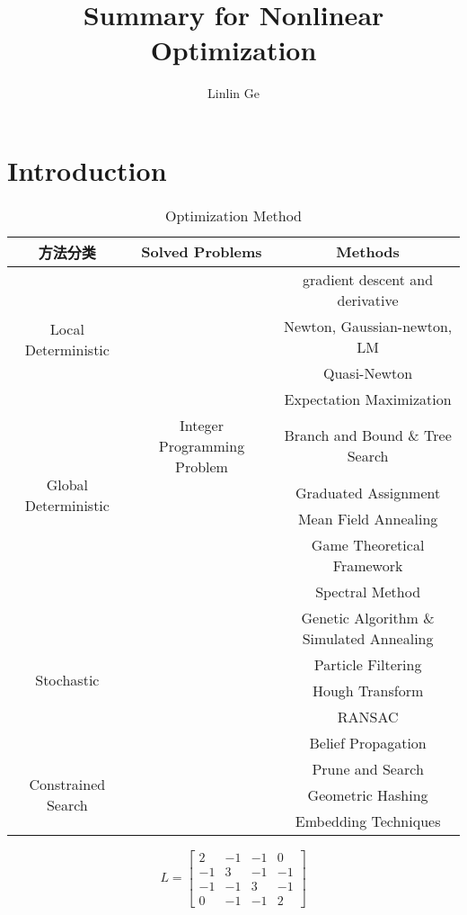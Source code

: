 \documentclass[10pt]{article}
\title{Summary for Nonlinear Optimization}
\author{Linlin Ge}
\date{}
\begin{document}
\maketitle

\section{Introduction}





\begin{table}[H]
\centering
\caption{Optimization Method}
\label{table1}
\begin{tabular}{|c|c|c|}
\hline  %
\multicolumn{1}{|c|}{方法分类}& Solved Problems  & Methods\\
\hline  %
\multirow{4}{*}{Local Deterministic}
 &  &gradient descent and derivative   \\
\cline{2-3}  %
~& & Newton, Gaussian-newton, LM \\
\cline{2-3}  %
~& & Quasi-Newton \\
\cline{2-3}  %
~& & Expectation Maximization \\


\hline  %
\multirow{4}{*}{Global Deterministic}
 &Integer Programming Problem  &Branch and Bound \& Tree Search   \\
\cline{2-3}  %
~& & Graduated Assignment \\
\cline{2-3}  %
~& & Mean Field Annealing \\
\cline{2-3}  %
~& & Game Theoretical Framework \\
\cline{2-3}  %
~& & Spectral Method \\

\hline  %
\multirow{5}{*}{Stochastic}
 & & Genetic Algorithm \& Simulated Annealing   \\
\cline{2-3}  %
~& & Particle Filtering \\
\cline{2-3}  %
~& & Hough Transform \\
\cline{2-3}  %
~& &RANSAC \\
\cline{2-3}  %
~& &Belief Propagation \\

\hline  %
\multirow{3}{*}{Constrained Search}
 & & Prune and Search   \\
\cline{2-3}  %
~& & Geometric Hashing \\
\cline{2-3}  %
~& & Embedding Techniques \\

\hline
\end{tabular}
\end{table}





$$L=
\left[
\begin{array}{cccc}
2 & -1 & -1 & 0 \\
-1 & 3 & -1 & -1 \\
-1 & -1 & 3 & -1 \\
0 & -1 & -1 & 2
\end{array}
\right]
$$

\begin{thebibliography}{1}



\end{thebibliography}
\end{document}
